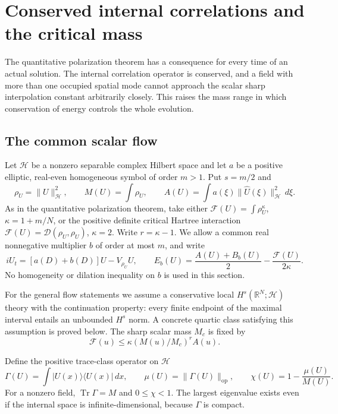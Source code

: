 \section{Conserved internal correlations and the critical mass}
\label{sec:r12-internal-dynamics}

The quantitative polarization theorem has a consequence for every time
of an actual solution. The internal correlation operator is conserved,
and a field with more than one occupied spatial mode cannot approach
the scalar sharp interpolation constant arbitrarily closely. This
raises the mass range in which conservation of energy controls the
whole evolution.

\subsection{The common scalar flow}
Let $\mathcal H$ be a nonzero separable complex Hilbert space and let
$a$ be a positive elliptic, real-even homogeneous symbol of order
$m>1$. Put $s=m/2$ and
\[
 \rho_U=\|U\|_{\mathcal H}^2,\qquad
 M(U)=\int\rho_U,\qquad
 A(U)=\int a(\xi)\|\widehat U(\xi)\|_{\mathcal H}^2\,d\xi.
\]
As in the quantitative polarization theorem, take either
$\mathcal F(U)=\int\rho_U^\kappa$, $\kappa=1+m/N$, or the positive
definite critical Hartree interaction
$\mathcal F(U)=\mathcal D(\rho_U,\rho_U)$, $\kappa=2$.
Write $r=\kappa-1$. We allow a common real nonnegative multiplier
$b$ of order at most $m$, and write
\begin{equation}\label{eq:r12-internal-flow}
 iU_t=[a(D)+b(D)]U-V_{\rho_U}U,\qquad
 E_b(U)=\frac{A(U)+B_b(U)}2-\frac{\mathcal F(U)}{2\kappa}.
\end{equation}
No homogeneity or dilation inequality on $b$ is used in this section.

For the general flow statements we assume a conservative local
$H^s(\mathbb R^N;\mathcal H)$ theory with the continuation property:
every finite endpoint of the maximal interval entails an unbounded
$H^s$ norm. A concrete quartic class satisfying this assumption is
proved below. The sharp scalar mass $M_c$ is fixed by
\[
 \mathcal F(u)\le\kappa(M(u)/M_c)^r A(u).
\]

Define the positive trace-class operator on $\mathcal H$
\begin{equation}\label{eq:r12-Gamma}
 \Gamma(U)=\int |U(x)\rangle\langle U(x)|\,dx,
 \qquad \mu(U)=\|\Gamma(U)\|_{\mathrm{op}},
 \qquad \chi(U)=1-\frac{\mu(U)}{M(U)}.
\end{equation}
For a nonzero field, $\operatorname{Tr}\Gamma=M$ and $0\le\chi<1$.
The largest eigenvalue exists even if the internal space is
infinite-dimensional, because $\Gamma$ is compact.

